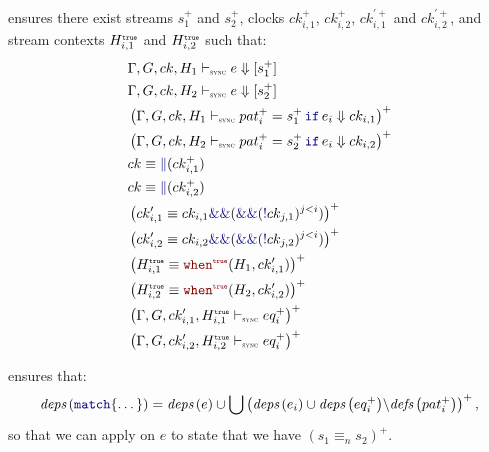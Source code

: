 \begin{skippableproof}
     ensures there exist streams $s_1^+$ and $s_2^+$,
    clocks $ck_{i, 1}^+$, $ck_{i, 2}^+$, $ck_{i, 1}^{\prime+}$ and $ck_{i, 2}^{\prime+}$, and stream
    contexts $H^{\mbox{\tiny\ensuremath{\mathtt{{true}}}}}_{i, 1}$ and $H^{\mbox{\tiny\ensuremath{\mathtt{{true}}}}}_{i, 2}$ such that:
    \begin{align*}
         & \exprDenot{H_1}{ck}{e}{s_1^+}                                                                \\
         & \exprDenot{H_2}{ck}{e}{s_2^+}                                                                \\
         & \left(\patDenot{H_1}{ck}{\guarded{pat_i^+ = s_1^+}{e_i}}{ck_{i, 1}}\right)^+                 \\
         & \left(\patDenot{H_2}{ck}{\guarded{pat_i^+ = s_2^+}{e_i}}{ck_{i, 2}}\right)^+                 \\
         & ck \equiv \kwf{\Vert}(ck_{i, 1}^+)                                                           \\
         & ck \equiv \kwf{\Vert}(ck_{i, 2}^+)                                                           \\
         & \left(ck'_{i, 1} \equiv ck_{i, 1} \kwf{\&\&} (\kwf{\&\&}(\kwf{!}ck_{j, 1})^{j < i})\right)^+ \\
         & \left(ck'_{i, 2} \equiv ck_{i, 2} \kwf{\&\&} (\kwf{\&\&}(\kwf{!}ck_{j, 2})^{j < i})\right)^+ \\
         & \left(H^\T_{i, 1} \equiv \whenT{H_1}{ck'_{i, 1}}\right)^+                                    \\
         & \left(H^\T_{i, 2} \equiv \whenT{H_2}{ck'_{i, 2}}\right)^+                                    \\
         & \left(\eqDenot{H^\T_{i, 1}}{ck'_{i, 1}}{eq_i^+}\right)^+                                     \\
         & \left(\eqDenot{H^\T_{i, 2}}{ck'_{i, 2}}{eq_i^+}\right)^+
    \end{align*}

     ensures that: $$\deps{\kwf
            {match}\{\dots\}} = \deps{e} \cup \bigcup \left(\deps{e_i} \cup \deps{eq_i^+} \backslash
        \defs{pat_i^+}\right)^+,$$ so that we can apply  on
    $e$ to state that we have $(s_1 \equiv_n s_2)^+$.


\end{skippableproof}
